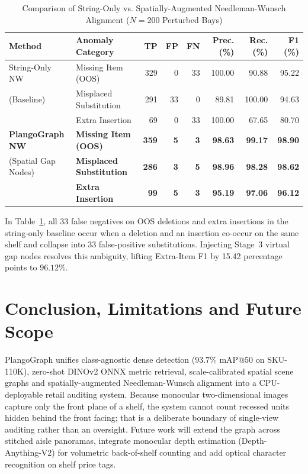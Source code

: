 \documentclass[10pt,a4paper]{article}
\begin{document}
\begin{table}[h]
\centering
\caption{Comparison of String-Only vs. Spatially-Augmented Needleman-Wunsch Alignment ($N=200$ Perturbed Bays)}
\label{tab:lncs_anom}
\footnotesize
\begin{tabularx}{\textwidth}{l X r r r r r r}
\toprule
\textbf{Method} & \textbf{Anomaly Category} & \textbf{TP} & \textbf{FP} & \textbf{FN} & \textbf{Prec. (\%)} & \textbf{Rec. (\%)} & \textbf{F1 (\%)} \\
\midrule
String-Only NW & Missing Item (OOS) & 329 & 0 & 33 & 100.00 & 90.88 & 95.22 \\
(Baseline) & Misplaced Substitution & 291 & 33 & 0 & 89.81 & 100.00 & 94.63 \\
 & Extra Insertion & 69 & 0 & 33 & 100.00 & 67.65 & 80.70 \\
\midrule
\textbf{PlangoGraph NW} & \textbf{Missing Item (OOS)} & \textbf{359} & \textbf{5} & \textbf{3} & \textbf{98.63} & \textbf{99.17} & \textbf{98.90} \\
(Spatial Gap Nodes) & \textbf{Misplaced Substitution} & \textbf{286} & \textbf{3} & \textbf{5} & \textbf{98.96} & \textbf{98.28} & \textbf{98.62} \\
 & \textbf{Extra Insertion} & \textbf{99} & \textbf{5} & \textbf{3} & \textbf{95.19} & \textbf{97.06} & \textbf{96.12} \\
\bottomrule
\end{tabularx}
\end{table}

In Table~\ref{tab:lncs_anom}, all 33 false negatives on OOS deletions and extra insertions in the string-only baseline occur when a deletion and an insertion co-occur on the same shelf and collapse into 33 false-positive substitutions. Injecting Stage~3 virtual gap nodes resolves this ambiguity, lifting Extra-Item F1 by 15.42 percentage points to $96.12\%$.

\section{Conclusion, Limitations and Future Scope}
PlangoGraph unifies class-agnostic dense detection ($93.7\%$ $\text{mAP}@50$ on SKU-110K), zero-shot DINOv2 ONNX metric retrieval, scale-calibrated spatial scene graphs and spatially-augmented Needleman-Wunsch alignment into a CPU-deployable retail auditing system. Because monocular two-dimensional images capture only the front plane of a shelf, the system cannot count recessed units hidden behind the front facing; that is a deliberate boundary of single-view auditing rather than an oversight. Future work will extend the graph across stitched aisle panoramas, integrate monocular depth estimation (Depth-Anything-V2) for volumetric back-of-shelf counting and add optical character recognition on shelf price tags.
\end{document}
